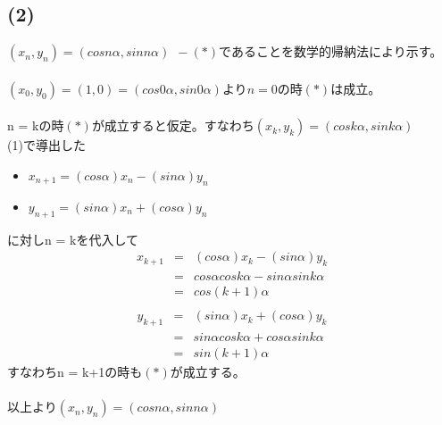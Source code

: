 \documentclass[a4j,12pt,draft]{jarticle}
\begin{document}
	\subsection*{(2)}
		$(x_n,y_n) = (cos n \alpha,sin n \alpha) \ \ -(*)$であることを数学的帰納法により示す。
		\paragraph{}
			$(x_0,y_0) = (1,0) = (cos0 \alpha,sin0 \alpha)$より$n =0$の時$(*)$は成立。
		\paragraph{}
			n = kの時$(*)$が成立すると仮定。すなわち$(x_k,y_k) = (cos k\alpha,sin k \alpha)$ \\
			(1)で導出した
				\begin{itemize}
					\item $x_{n+1} = (cos\alpha)x_n - (sin\alpha)y_n$
					\item $y_{n+1} = (sin\alpha)x_n + (cos \alpha)y_n$
				\end{itemize}
			に対しn = kを代入して
				\begin{eqnarray*}
					x_{k+1} &=&  (cos\alpha)x_k - (sin\alpha)y_k \\
							&=&cos\alpha cosk\alpha - sin\alpha sink\alpha \\ &=& 
							cos(k + 1)\alpha \\
				\end{eqnarray*}
				\begin{eqnarray*}
					y_{k+1} &=& (sin\alpha)x_k + (cos \alpha)y_k \\
						&=& sin\alpha cosk\alpha + cos\alpha sink \alpha \\
						&=& sin(k + 1)\alpha
				\end{eqnarray*}
			すなわちn = k+1の時も$(*)$が成立する。
			
		\paragraph{}
		以上より$(x_n,y_n) = (cosn\alpha,sinn\alpha)$
			
\end{document}
